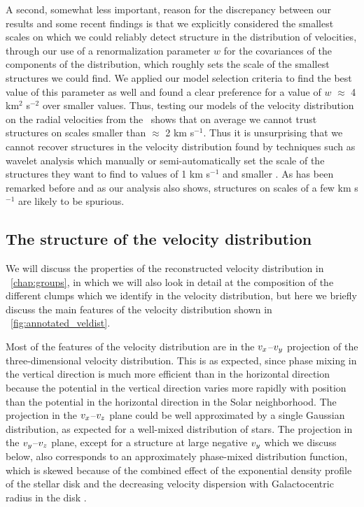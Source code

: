 A second, somewhat less important, reason for the discrepancy between
our results and some recent findings is that we explicitly considered
the smallest scales on which we could reliably detect structure in the
distribution of velocities, through our use of a renormalization
parameter $w$ for the covariances of the components of the
distribution, which roughly sets the scale of the smallest structures
we could find. We applied our model selection criteria to find the
best value of this parameter as well and found a clear preference for
a value of $w$ $\approx$ 4 km$^2$ s$^{-2}$ over smaller values. Thus,
testing our models of the velocity distribution on the radial
velocities from the \gcsabb\ shows that on average we cannot trust
structures on scales smaller than $\approx$ 2 km s$^{-1}$. Thus it is
unsurprising that we cannot recover structures in the velocity
distribution found by techniques such as wavelet analysis which
manually or semi-automatically set the scale of the structures they
want to find to values of 1 km s$^{-1}$ and smaller
\citep{2008A&A...490..135A,2009ApJ...692L.113Z}. As has been remarked
before \citep{1998AJ....115.2384D} and as our analysis also shows,
structures on scales of a few km s$^{-1}$ are likely to be spurious.


\subsection{The structure of the velocity distribution}

We will discuss the properties of the reconstructed velocity
distribution in \chaptername~\ref{chap:groups}, in which we will also
look in detail at the composition of the different clumps which we
identify in the velocity distribution, but here we briefly discuss the
main features of the velocity distribution shown in
\figurename~\ref{fig:annotated_veldist}.

Most of the features of the velocity distribution are in the
$v_x$--$v_y$ projection of the three-dimensional velocity
distribution. This is as expected, since phase mixing in the vertical
direction is much more efficient than in the horizontal direction
because the potential in the vertical direction varies more rapidly
with position than the potential in the horizontal direction in the
Solar neighborhood. The projection in the $v_x$--$v_z$ plane could be
well approximated by a single Gaussian distribution, as expected for a
well-mixed distribution of stars. The projection in the $v_y$--$v_z$
plane, except for a structure at large negative $v_y$ which we discuss
below, also corresponds to an approximately phase-mixed distribution
function, which is skewed because of the combined effect of the
exponential density profile of the stellar disk and the decreasing
velocity dispersion with Galactocentric radius in the disk
\citep{2008gady.book.....B}.

